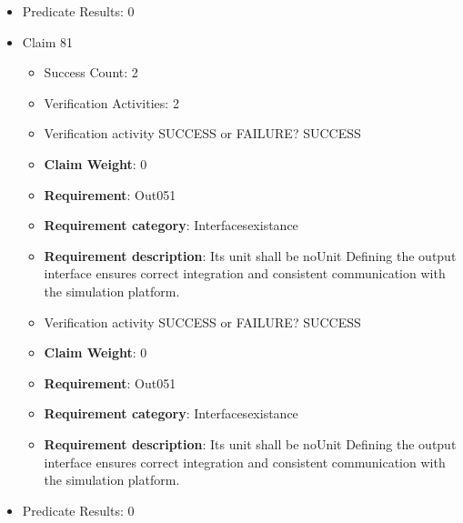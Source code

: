 \documentclass{article}
\begin{document}
\begin{itemize}
\begin{itemize}
					\item Verification activity SUCCESS or FAILURE? SUCCESS
					\item \textbf{Claim Weight}: 0
						\item \textbf{Requirement}: Out050 
						\item \textbf{Requirement category}: Interfacesexistance 
						\item \textbf{Requirement description}: Its unit shall be Bar Defining the output interface ensures correct integration and consistent communication with the simulation platform.
					
				\end{itemize}
				
									    
				\item Predicate Results: 0

  				  \item Claim 81
				\begin{itemize}
			    	\item Success Count: 2 
			    	\item Verification Activities: 2
					\item Verification activity SUCCESS or FAILURE? SUCCESS
					\item \textbf{Claim Weight}: 0
						\item \textbf{Requirement}: Out051 
						\item \textbf{Requirement category}: Interfacesexistance 
						\item \textbf{Requirement description}: Its unit shall be noUnit Defining the output interface ensures correct integration and consistent communication with the simulation platform.
					
					\item Verification activity SUCCESS or FAILURE? SUCCESS
					\item \textbf{Claim Weight}: 0
						\item \textbf{Requirement}: Out051 
						\item \textbf{Requirement category}: Interfacesexistance 
						\item \textbf{Requirement description}: Its unit shall be noUnit Defining the output interface ensures correct integration and consistent communication with the simulation platform.
					
				\end{itemize}
				
									    
				\item Predicate Results: 0


\end{itemize}
\end{document}
